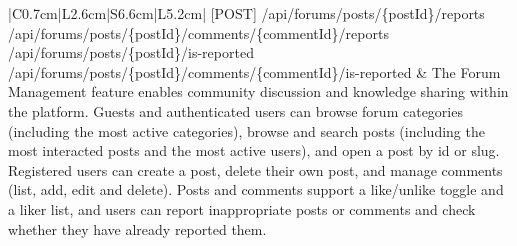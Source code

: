 \begin{longtable}{|C{0.7cm}|L{2.6cm}|S{6.6cm}|L{5.2cm}|}
[POST] /\allowbreak{}api/\allowbreak{}forums/\allowbreak{}posts/\allowbreak{}\{postId\}/\allowbreak{}reports \newline
[POST] /\allowbreak{}api/\allowbreak{}forums/\allowbreak{}posts/\allowbreak{}\{postId\}/\allowbreak{}comments/\allowbreak{}\{commentId\}/\allowbreak{}reports \newline
[GET] /\allowbreak{}api/\allowbreak{}forums/\allowbreak{}posts/\allowbreak{}\{postId\}/\allowbreak{}is-reported \newline
[GET] /\allowbreak{}api/\allowbreak{}forums/\allowbreak{}posts/\allowbreak{}\{postId\}/\allowbreak{}comments/\allowbreak{}\{commentId\}/\allowbreak{}is-reported
&
The Forum Management feature enables community discussion and knowledge sharing within the platform. Guests and authenticated users can browse forum categories (including the most active categories), browse and search posts (including the most interacted posts and the most active users), and open a post by id or slug. Registered users can create a post, delete their own post, and manage comments (list, add, edit and delete). Posts and comments support a like/unlike toggle and a liker list, and users can report inappropriate posts or comments and check whether they have already reported them.
\\ \hline


\end{longtable}
